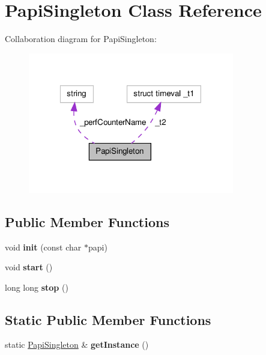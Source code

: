 \hypertarget{classPapiSingleton}{\section{Papi\-Singleton Class Reference}
\label{classPapiSingleton}
}


Collaboration diagram for Papi\-Singleton\-:\nopagebreak
\begin{figure}[H]
\begin{center}
\leavevmode
\includegraphics[width=255pt]{classPapiSingleton__coll__graph}
\end{center}
\end{figure}
\subsection*{Public Member Functions}
\begin{DoxyCompactItemize}
\item 
\hypertarget{classPapiSingleton_ae83e5ad470fd0b7484d8857ec24bf840}{void {\bfseries init} (const char $\ast$papi)}\label{classPapiSingleton_ae83e5ad470fd0b7484d8857ec24bf840}

\item 
\hypertarget{classPapiSingleton_a12f11e302235aad48df208dc4f347f37}{void {\bfseries start} ()}\label{classPapiSingleton_a12f11e302235aad48df208dc4f347f37}

\item 
\hypertarget{classPapiSingleton_ab3f97c135c3795a606523ad1cbd28ed5}{long long {\bfseries stop} ()}\label{classPapiSingleton_ab3f97c135c3795a606523ad1cbd28ed5}

\end{DoxyCompactItemize}
\subsection*{Static Public Member Functions}
\begin{DoxyCompactItemize}
\item 
\hypertarget{classPapiSingleton_ab2746ec28e6b64fb0982ccb25afb444a}{static \hyperlink{classPapiSingleton}{Papi\-Singleton} \& {\bfseries get\-Instance} ()}\label{classPapiSingleton_ab2746ec28e6b64fb0982ccb25afb444a}

\end{DoxyCompactItemize}
